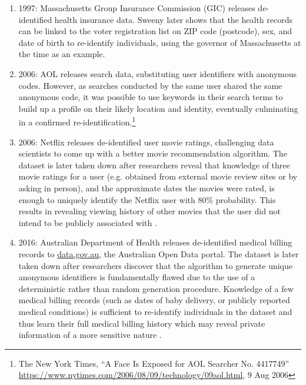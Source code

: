 \begin{enumerate}
\item 1997: Massachusetts Group Insurance Commission (GIC) releases de-identified health insurance data. Sweeny \cite{Sweeny2002} later shows that the health records can be linked to the voter registration list on ZIP code (postcode), sex, and date of birth to re-identify individuals, using the governor of Massachusetts at the time as an example.  %
\item 2006: AOL releases search data, substituting user identifiers with anonymous codes. However, as searches conducted by the same user shared the same anonymous code, it was possible to use keywords in their search terms to build up a profile on their likely location and identity, eventually culminating in a confirmed re-identification.\footnote{The New York Times, ``A Face Is Exposed for AOL Searcher No. 4417749'' \url{https://www.nytimes.com/2006/08/09/technology/09aol.html}, 9 Aug 2006} %
\item 2006: Netflix releases de-identified user movie ratings, challenging data scientists to come up with a better movie recommendation algorithm. The dataset is later taken down after researchers reveal that knowledge of three movie ratings for a user (e.g. obtained from external movie review sites or by asking in person), and the approximate dates the movies were rated, is enough to uniquely identify the Netflix user with 80\% probability. This results in revealing viewing history of other movies that the user did not intend to be publicly associated with \cite{Narayanan2008}. %
\item 2016: Australian Department of Health releases de-identified medical billing records to \url{data.gov.au}, the Australian Open Data portal. The dataset is later taken down after researchers discover that the algorithm to generate unique anonymous identifiers is fundamentally flawed due to the use of a deterministic rather than random generation procedure. Knowledge of a few medical billing records (such as dates of baby delivery, or publicly reported medical conditions) is sufficient to re-identify individuals in the dataset and thus learn their full medical billing history which may reveal private information of a more sensitive nature \cite{Culnane2017}.
\end{enumerate}

